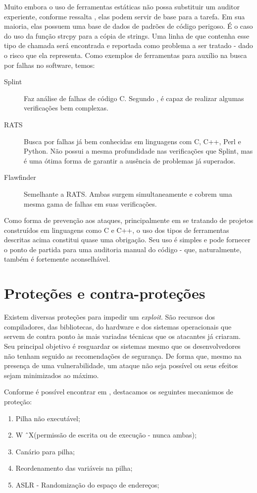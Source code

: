 			Muito embora o uso de ferramentas estáticas não possa substituir um auditor experiente,
			conforme ressalta \cite{Anley2007}, elas podem servir de base para a tarefa.
			Em sua maioria, elas possuem uma base de dados de padrões de código perigoso.
			É o caso do uso da função strcpy para a cópia de strings. Uma linha de que contenha
			esse tipo de chamada será encontrada e reportada como problema a ser tratado - dado
			o risco que ela representa.
			Como exemplos de ferramentas para auxílio na busca por falhas no software, temos:
			\begin{description}
				\item[Splint]{Faz análise de falhas de código C. Segundo \cite{Anley2007}, é capaz
					de realizar algumas verificações bem complexas.}
				\item[RATS]{Busca por falhas já bem conhecidas em linguagens com C, C++, Perl e Python.
					Não possui a mesma profundidade nas verificações que Splint, mas é uma ótima
					forma de garantir a ausência de problemas já superados.}
				\item[Flawfinder]{Semelhante a RATS. Ambas surgem simultaneamente e cobrem uma mesma
					gama de falhas em suas verificações.}
			\end{description}
			

			Como forma de prevenção aos ataques, principalmente em se tratando de projetos
			construídos em linguagens como C e C++, o uso dos tipos de ferramentas descritas
			acima constitui quase uma obrigação. Seu uso é simples e pode fornecer o ponto
			de partida para uma auditoria manual do código - que, naturalmente, também é fortemente
			aconselhável.

	
	\section{Proteções e contra-proteções}
	\label{sec:exploit_protection}
		Existem diversas proteções para impedir um \textsl{exploit}.
		São recursos dos compiladores, das bibliotecas, do hardware e dos sistemas operacionais
		que servem de contra ponto às mais variadas técnicas que os atacantes já criaram.
		Seu principal objetivo é resguardar os sistemas mesmo que os desenvolvedores
		não tenham seguido as recomendações de segurança. De forma que, mesmo na presença de uma
		vulnerabilidade, um ataque não seja possível ou seus efeitos sejam minimizados ao máximo.
		
		
		Conforme é possível encontrar em \cite{Anley2007}, destacamos os seguintes mecanismos
		de proteção:
		\begin{enumerate}
			\item{Pilha não executável;}
			\item{W \^\ X(permissão de escrita ou de execução - nunca ambas);}
			\item{Canário para pilha;}
			\item{Reordenamento das variáveis na pilha;}
			\item{ASLR - Randomização do espaço de endereços;}
		\end{enumerate}

